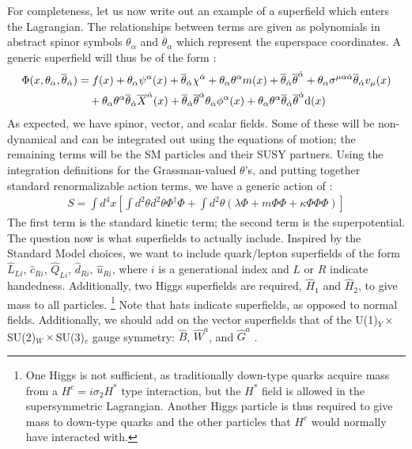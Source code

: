 For completeness, let us now write out an example of a superfield which enters the Lagrangian. The relationships between terms are given as polynomials in abstract spinor symbols $\theta_\alpha$ and $\overline{\theta}_{\dot{\alpha}}$ which represent the superspace coordinates. A generic superfield will thus be of the form \cite{Jungman}:
\begin{align}
  \Phi(x, \theta_\alpha, \overline{\theta}_{\dot{\alpha}}) &= f(x) + \theta_\alpha \psi^\alpha(x) + \overline{\theta}_{\dot{\alpha}} \chi^{\dot{\alpha}} + \theta_\alpha \theta^\alpha m(x) + \overline{\theta}_{\dot{\alpha}} \overline{\theta}^{\dot{\alpha}} + \theta_\alpha \sigma^{\mu \alpha \dot{\alpha}} \overline{\theta}_{\dot{\alpha}} v_\mu(x) \nonumber\\
  &\quad + \theta_\alpha \theta^\alpha \overline{\theta}_{\dot{\alpha}} \overline{X}^{\dot{\alpha}}(x) + \overline{\theta}_{\dot{\alpha}} \overline{\theta}^{\dot{\alpha}} \theta_\alpha \phi^\alpha (x) + \theta_\alpha \theta^\alpha \overline{\theta}_{\dot{\alpha}} \overline{\theta}^{\dot{\alpha}}\mathrm{d}(x)
\end{align}
As expected, we have spinor, vector, and scalar fields. Some of these will be non-dynamical and can be integrated out using the equations of motion; the remaining terms will be the SM particles and their SUSY partners. Using the integration definitions for the Grassman-valued $\theta$'s, and putting together standard renormalizable action terms, we have a generic action of \cite{Jungman}:
\begin{align}
  S = \int d^4 x\left[ \int d^2\theta d^2 \theta \Phi^\dagger \Phi + \int d^2\theta \left( \lambda \Phi + m \Phi \Phi + \kappa \Phi \Phi \Phi \right) \right]
\end{align}
The first term is the standard kinetic term; the second term is the superpotential. The question now is what superfields to actually include. Inspired by the Standard Model choices, we want to include quark/lepton superfields of the form $\hat{L}_{Li}$, $\hat{c}_{Ri}$, $\hat{Q}_{Li}$, $\hat{d}_{Ri}$, $\hat{u}_{Ri}$, where $i$ is a generational index and $L$ or $R$ indicate handedness. Additionally, two Higgs superfields are required, $\hat{H}_1$ and $\hat{H}_2$, to give mass to all particles. \footnote{One Higgs is not sufficient, as traditionally down-type quarks acquire mass from a $H^c = i \sigma_2 H^*$ type interaction, but the $H^*$ field is allowed in the supersymmetric Lagrangian. Another Higgs particle is thus required to give mass to down-type quarks and the other particles that $H^c$ would normally have interacted with.} Note that hats indicate superfields, as opposed to normal fields. Additionally, we should add on the vector superfields that of the U(1)$_Y\times$SU(2)$_W\times$SU(3)$_c$ gauge symmetry: $\hat{B}$, $\hat{W}^a$, and $\hat{G}^a$ \cite{Jungman}.

